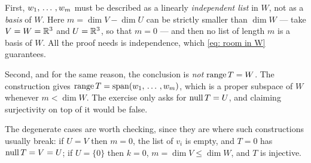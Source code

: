 \begin{ainote}
  First, $w_1, {\, \ldots \,\,}, w_m$ must be described as a linearly \emph{independent list} in $W$, not as a \emph{basis} of $W$. Here $m = \dim V - \dim U$ can be strictly smaller than $\dim W$ --- take $V = W = \mathbb{R}^3$ and $U = \mathbb{R}^3$, so that $m = 0$ --- and then no list of length $m$ is a basis of $W$. All the proof needs is independence, which \eqref{eq: room in W} guarantees.

  Second, and for the same reason, the conclusion is \emph{not} $\operatorname{range} T = W$. The construction gives $\operatorname{range} T = \operatorname{span} (w_1, {\, \ldots \,\,}, w_m)$, which is a proper subspace of $W$ whenever $m < \dim W$. The exercise only asks for $\operatorname{null} T = U$, and claiming surjectivity on top of it would be false.

  The degenerate cases are worth checking, since they are where such constructions usually break: if $U = V$ then $m=0$, the list of $v_i$ is empty, and $T = 0$ has $\operatorname{null} T = V = U$; if $U = \{0\}$ then $k=0$, $m = \dim V \leq \dim W$, and $T$ is injective.
\end{ainote}

